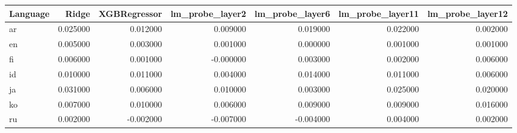 \begin{tabular}{lrrrrrr}
\toprule
Language & Ridge & XGBRegressor & lm_probe_layer2 & lm_probe_layer6 & lm_probe_layer11 & lm_probe_layer12 \\
\midrule
ar & 0.025000 & 0.012000 & 0.009000 & 0.019000 & 0.022000 & 0.002000 \\
en & 0.005000 & 0.003000 & 0.001000 & 0.000000 & 0.001000 & 0.001000 \\
fi & 0.006000 & 0.001000 & -0.000000 & 0.003000 & 0.002000 & 0.006000 \\
id & 0.010000 & 0.011000 & 0.004000 & 0.014000 & 0.011000 & 0.006000 \\
ja & 0.031000 & 0.006000 & 0.010000 & 0.003000 & 0.025000 & 0.020000 \\
ko & 0.007000 & 0.010000 & 0.006000 & 0.009000 & 0.009000 & 0.016000 \\
ru & 0.002000 & -0.002000 & -0.007000 & -0.004000 & 0.004000 & 0.002000 \\
\bottomrule
\end{tabular}
